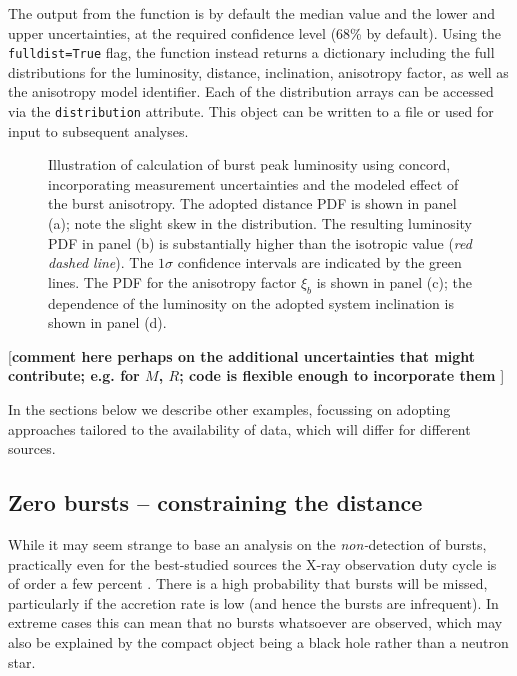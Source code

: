 \documentclass{aastex63}
\begin{document}
The output from the function is by default the median value and the lower and upper uncertainties, at the required confidence level (68\% by default). Using the {\tt fulldist=True} flag, the function instead returns a dictionary including the full distributions for the luminosity, distance, inclination, anisotropy factor, as well as the anisotropy model identifier. %
Each of the distribution arrays can be accessed via the {\tt distribution} attribute.
This object can be written to a file or used for input to subsequent analyses.

\begin{figure}[ht!]
\caption{Illustration of calculation of burst peak luminosity using {\sc concord}, incorporating measurement uncertainties and the modeled effect of the burst anisotropy. The adopted distance PDF is shown in panel (a); note the slight skew in the distribution. The resulting luminosity PDF in panel (b) is substantially higher than the isotropic value ({\it red dashed line}). The $1\sigma$ confidence intervals are indicated by the green lines. The PDF for the anisotropy factor $\xi_b$ is shown in panel (c); the dependence of the luminosity on the adopted system inclination is shown in panel (d).
\label{fig:burstlum}}
\end{figure}

[{\bf comment here perhaps on the additional uncertainties that might contribute; e.g. for $M$, $R$; code is flexible enough to incorporate them }]

In the sections below we describe other examples,
%
focussing on adopting approaches tailored to the availability of data, which will differ for different sources. 

\subsection{Zero bursts -- constraining the distance}
\label{subsec:zerobursts}

While it may seem strange to base an analysis on the {\it non-}detection of bursts, practically even for the best-studied sources the X-ray observation duty cycle is of order a few percent \cite[e.g.][]{minbar}. There is a high probability that bursts will be missed, particularly if the accretion rate is low (and hence the bursts are infrequent). In extreme cases this can mean that no bursts whatsoever are observed,  which may also be explained by the compact object being a black hole rather than a neutron star.
\end{document}
